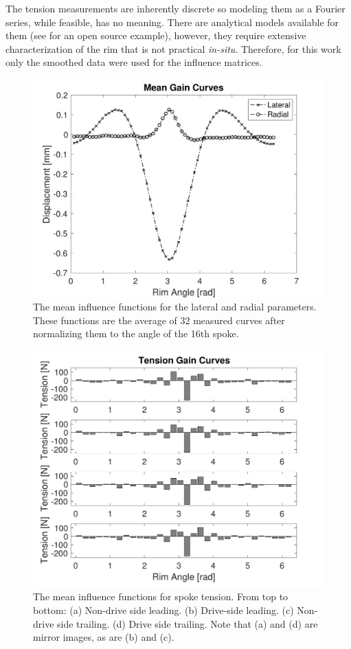 \documentclass[journal]{IEEEtran}
\begin{document}
The tension measurements are inherently discrete so modeling them as a Fourier series, while feasible, has no meaning. There are analytical models available for them (see \cite{ModeMatrix} for an open source example), however, they require extensive characterization of the rim that is not practical \emph{in-situ}.  Therefore, for this work only the smoothed data were used for the influence matrices.  

\begin{figure}[!t]
\centering
\includegraphics[width=3.25 in]{./figs/gc_lat_rad}
\caption{The mean influence functions for the lateral and radial parameters.  These functions are the average of 32 measured curves after normalizing them to the angle of the 16th spoke.}
\label{fig:gclr}
\end{figure}

\begin{figure}[!t]
\centering
\includegraphics[width=3.25 in]{./figs/gc_ten}
\caption{The mean influence functions for spoke tension. From top to bottom: (a) Non-drive side leading. (b) Drive-side leading. (c) Non-drive side trailing. (d) Drive side trailing.  Note that (a) and (d) are mirror images, as are (b) and (c).}
\label{fig:gc_ten}
\end{figure}
\end{document}
